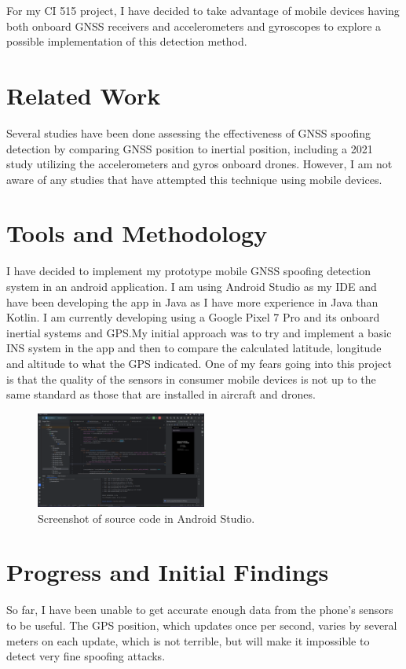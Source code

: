\documentclass[conference]{IEEEtran}
\begin{document}
For my CI 515 project, I have decided to take advantage of mobile devices having both onboard GNSS receivers and accelerometers and gyroscopes to explore a possible implementation of this detection method.

\section{Related Work}
Several studies have been done assessing the effectiveness of GNSS spoofing detection by comparing GNSS position to inertial position, including a 2021 study utilizing the accelerometers and gyros onboard drones\cite{meng2021}. However, I am not aware of any studies that have attempted this technique using mobile devices.

\section{Tools and Methodology}
I have decided to implement my prototype mobile GNSS spoofing detection system in an android application. I am using Android Studio as my IDE and have been developing the app in Java as I have more experience in Java than Kotlin. I am currently developing using a Google Pixel 7 Pro and its onboard inertial systems and  GPS.\@ My initial approach was to try and implement a basic INS system in the app and then to compare the calculated latitude, longitude and altitude to what the GPS indicated. One of my fears going into this project is that the quality of the sensors in consumer mobile devices is not up to the same standard as those that are installed in aircraft and drones.

\begin{figure}[htbp]
 \centerline{\includegraphics[width=0.5\textwidth]{figs/android_studio.png}}
 \caption{Screenshot of source code in Android Studio.}
\end{figure}

\section{Progress and Initial Findings}
So far, I have been unable to get accurate enough data from the phone’s sensors to be useful. The GPS position, which updates once per second, varies by several meters on each update, which is not terrible, but will make it impossible to detect very fine spoofing attacks. 
\end{document}
